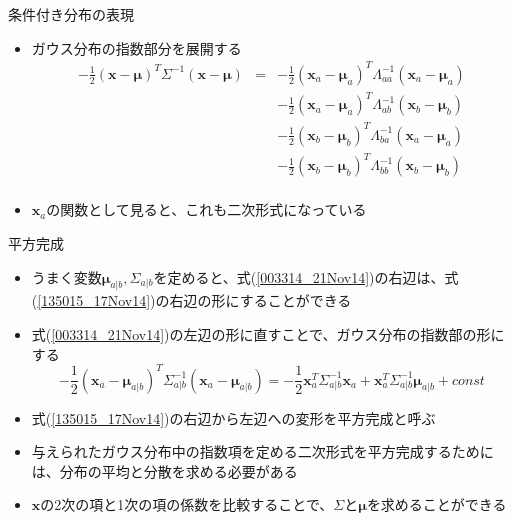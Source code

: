 \begin{frame}{条件付き分布の表現}
 \begin{itemize}
  \item ガウス分布の指数部分を展開する
        \begin{eqnarray}
         -\frac{1}{2}(\bm{x} - \bm{\mu})^{T}\Sigma^{-1}(\bm{x}-\bm{\mu}) &= &
          -\frac{1}{2}(\bm{x}_a - \bm{\mu}_a)^{T}\Lambda_{aa}^{-1}(\bm{x}_a-\bm{\mu}_a) \nonumber \\
         &&-\frac{1}{2}(\bm{x}_a - \bm{\mu}_a)^{T}\Lambda_{ab}^{-1}(\bm{x}_b-\bm{\mu}_b) \nonumber \\
         &&-\frac{1}{2}(\bm{x}_b - \bm{\mu}_b)^{T}\Lambda_{ba}^{-1}(\bm{x}_a-\bm{\mu}_a) \nonumber \\
         &&-\frac{1}{2}(\bm{x}_b - \bm{\mu}_b)^{T}\Lambda_{bb}^{-1}(\bm{x}_b-\bm{\mu}_b) \nonumber \\
         &&\label{003314_21Nov14}
        \end{eqnarray}
  \item $\bm{x}_a$の関数として見ると、これも\alert{二次形式}になっている
 \end{itemize}
\end{frame}

\begin{frame}{平方完成}
 \begin{itemize}
  \item うまく変数$\bm{\mu}_{a|b},\Sigma_{a|b}$を定めると、式(\ref{003314_21Nov14})の右辺は、式(\ref{135015_17Nov14})の右辺の形にすることができる
  \item 式(\ref{003314_21Nov14})の左辺の形に直すことで、ガウス分布の指数部の形にする
        \begin{equation}
         -\frac{1}{2}(\bm{x}_a-\bm{\mu}_{a|b})^{T}\Sigma_{a|b}^{-1}(\bm{x}_a-\bm{\mu}_{a|b}) = -\frac{1}{2}\bm{x}_a^T\Sigma_{a|b}^{-1}\bm{x}_a+\bm{x}_a^T\Sigma_{a|b}^{-1}\bm{\mu}_{a|b} + const\label{135015_17Nov14}
        \end{equation}
  \item 式(\ref{135015_17Nov14})の右辺から左辺への変形を\alert{平方完成}と呼ぶ

  \item 与えられたガウス分布中の指数項を定める二次形式を平方完成するためには、分布の平均と分散を求める必要がある
  \item $\bm{x}$の2次の項と1次の項の係数を比較することで、$\Sigma$と$\bm{\mu}$を求めることができる
 \end{itemize}
\end{frame}

